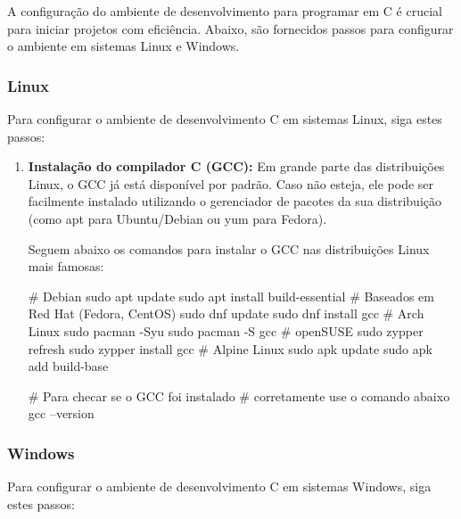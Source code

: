 A configuração do ambiente de desenvolvimento para programar em C é crucial 
para iniciar projetos com eficiência. Abaixo, são fornecidos passos para 
configurar o ambiente em sistemas Linux e Windows.

\subsubsection{Linux}

Para configurar o ambiente de desenvolvimento C em sistemas Linux, siga estes 
passos:

\begin{enumerate}
    \item \textbf{Instalação do compilador C (GCC):} 
        Em grande parte das distribuições Linux, o GCC já está disponível por 
        padrão. Caso não esteja, ele pode ser facilmente instalado utilizando 
        o gerenciador de pacotes da sua distribuição (como apt para 
        Ubuntu/Debian ou yum para Fedora).
        
        Seguem abaixo os comandos para instalar o GCC nas distribuições Linux 
        mais famosas:

        \begin{textbox}
        # Debian
        sudo apt update
        sudo apt install build-essential
        # Baseados em Red Hat (Fedora, CentOS)
        sudo dnf update
        sudo dnf install gcc
        # Arch Linux
        sudo pacman -Syu
        sudo pacman -S gcc
        # openSUSE
        sudo zypper refresh
        sudo zypper install gcc
        # Alpine Linux
        sudo apk update
        sudo apk add build-base

        # Para checar se o GCC foi instalado 
        # corretamente use o comando abaixo
        gcc --version
        \end{textbox}
\end{enumerate}

\subsubsection{Windows}

Para configurar o ambiente de desenvolvimento C em sistemas Windows, siga 
estes passos:

